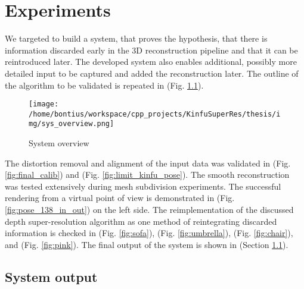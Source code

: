 \documentclass{ucl_thesis}
\newcommand{\figref}[1]{(Fig. \ref{#1})}
\newcommand{\secref}[1]{(Section \ref{#1})}
\begin{document}
\chapter{Experiments}
\label{chp:validation}

We targeted to build a system, that proves the hypothesis, that there is information discarded early in the 3D reconstruction pipeline and that it can be reintroduced later. The developed system also enables additional, possibly more detailed input to be captured and added the reconstruction later. The outline of the algorithm to be validated is repeated in \figref{fig:sys_overview2}.

\begin{figure}[h!]\centering
    \texttt{[image: /home/bontius/workspace/cpp\_projects/KinfuSuperRes/thesis/img/sys\_overview.png]}
    \caption{System overview}
    \label{fig:sys_overview2}
\end{figure}

The distortion removal and alignment of the input data was validated in \figref{fig:final_calib} and \figref{fig:limit_kinfu_pose}. The smooth reconstruction was tested extensively during mesh subdivision experiments. The successful rendering from a virtual point of view is demonstrated in \figref{fig:pose_138_in_out} on the left side. The reimplementation of the discussed depth super-resolution algorithm as one method of reintegrating discarded information is checked in \figref{fig:sofa}, \figref{fig:umbrella}, \figref{fig:chair}, and \figref{fig:pink}. The final output of the system is shown in \secref{sec:results}.

\section{System output}
\label{sec:results}
\end{document}
